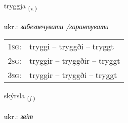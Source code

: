 \documentclass[frontgrid, backgrid]{flacards}\usepackage[]{graphicx}\usepackage[]{xcolor}
\begin{document}
\renewcommand{\flhead}{\vskip5pt \fboxsep=0pt {\small\bfseries\footnotesize Sagnorð | дієслово}}
\renewcommand{\fcfoot}{\vskip5pt \fboxsep=0pt \hspace{2pt}{\small\bfseries\footnotesize 1K}}

\renewcommand{\blhead}{\vskip5pt {\small\bfseries\footnotesize Sagnorð | дієслово }}
\renewcommand{\bcfoot}{\vskip5pt \hspace{2pt}{\small\bfseries\footnotesize 1K}}


{tryggja \small{\textsubscript{(\textit{v.})}} \\[1ex] %
\textphonetic{[tʰrɪca]} \\
ukr.: \emph{забезпечувати /гарантувати} \\  [2ex]
\renewcommand*{\arraystretch}{0.8}
\begin{tabular}{p{1cm}l}
\textsc{1sg}: & tryggi -- tryggði -- tryggt \\ 
\textsc{2sg}: & tryggir -- tryggðir -- tryggt \\ 
\textsc{3sg}: & tryggir -- tryggði -- tryggt \\ 
\end{tabular}
}

\renewcommand{\flhead}{\vskip5pt \fboxsep=0pt {\small\bfseries\footnotesize Nafnorð | іменник}}
\renewcommand{\fcfoot}{\vskip5pt \fboxsep=0pt \hspace{2pt}{\small\bfseries\footnotesize 1K}}

\renewcommand{\blhead}{\vskip5pt {\small\bfseries\footnotesize Nafnorð | іменник }}
\renewcommand{\bcfoot}{\vskip5pt \hspace{2pt}{\small\bfseries\footnotesize 1K}}


{skýrsla \small{\textsubscript{(\textit{f.})}} \\[1ex] %
 \\
ukr.: \emph{звіт} \\  [2ex]
\renewcommand*{\arraystretch}{0.8}
}
\end{document}
